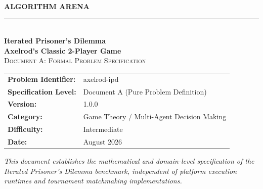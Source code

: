﻿\documentclass[11pt,a4paper]{article}
\newcommand{\shortname}{axelrod-ipd}
\newcommand{\problemversion}{1.0.0}
\newcommand{\problemdate}{August 2026}
\begin{document}
\hypersetup{pageanchor=false}
\begin{titlepage}

    \centering
    \vspace*{1.0cm}

    {\Large\textbf{\color{arenaBlue}ALGORITHM ARENA}}\\[0.4cm]
    {\color{codegray!60}\rule{0.5\textwidth}{0.8pt}}\\[1.2cm]

    {\fontsize{26}{34}\selectfont\textbf{Iterated Prisoner's Dilemma}}\\[0.4cm]
    {\Large\color{arenaBlue}\textbf{Axelrod's Classic 2-Player Game}}\\[1.2cm]

    {\large\textsc{Document A: Formal Problem Specification}}\\[1.5cm]

    \begin{tabular}{ll}
        \toprule
        \textbf{Problem Identifier:} & \shortname \\
        \textbf{Specification Level:}& Document A (Pure Problem Definition) \\
        \textbf{Version:}            & \problemversion \\
        \textbf{Category:}           & Game Theory / Multi-Agent Decision Making \\
        \textbf{Difficulty:}         & Intermediate \\
        \textbf{Date:}               & \problemdate \\
        \bottomrule
    \end{tabular}

    \vfill

    \parbox{0.85\textwidth}{
        \centering\textit{
            This document establishes the mathematical and domain-level specification
            of the Iterated Prisoner's Dilemma benchmark, independent of platform
            execution runtimes and tournament matchmaking implementations.
        }
    }

\end{titlepage}
\hypersetup{pageanchor=true}

\tableofcontents
\newpage
{}
\end{document}
